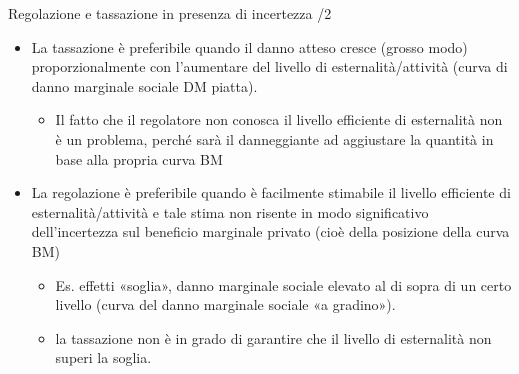 \documentclass[aspectratio=64,12pt]{beamer}
\begin{document}
\begin{frame}{Regolazione e tassazione in presenza di incertezza /2}
\begin{itemize}
\item \alert{La tassazione è preferibile} quando il danno atteso cresce
(grosso modo) proporzionalmente con l'aumentare del livello di
esternalità/attività (curva di danno marginale sociale DM piatta).
\begin{itemize}
\item Il fatto che il regolatore non conosca il livello efficiente di
esternalità non è un problema, perché sarà il danneggiante ad aggiustare la
quantità in base alla propria curva BM
\end{itemize}

\item \alert{La regolazione è preferibile} quando è facilmente stimabile il
livello efficiente di esternalità/attività e tale stima non risente in modo
significativo dell'incertezza sul beneficio marginale privato (cioè della
posizione della curva BM)
\begin{itemize}
\item Es. effetti «soglia», danno marginale sociale elevato al di sopra di un
certo livello (curva del danno marginale sociale «a gradino»).
\item la tassazione non è in grado di garantire che il livello di esternalità
non superi la soglia.
\end{itemize}
\end{itemize}
\end{frame}
\end{document}

